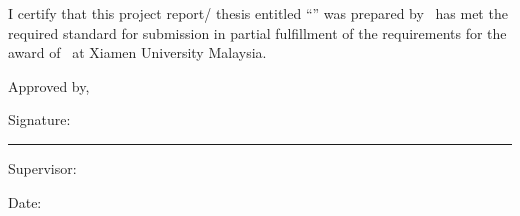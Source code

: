 
{\raggedright
I certify that this project report/ thesis entitled ``\MakeUppercase{\xmumThesisTitle}''
was prepared by \xmumStudentName\ has met the required standard for submission
in partial fulfillment of the requirements for the award of \xmumDegree\ at
Xiamen University Malaysia.\par
}

\vspace{2\baselineskip}

Approved by,

\vspace{2\baselineskip}

Signature: \rule{6cm}{0.4pt}\par
Supervisor: \xmumSupervisor\par
Date: \xmumSubmissionDate\par

\xmumcosupervisorapprovalblock
